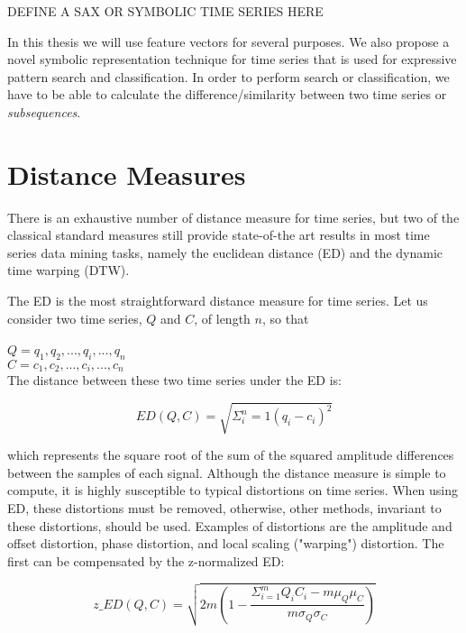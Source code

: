 DEFINE A SAX OR SYMBOLIC TIME SERIES HERE

\par

In this thesis we will use feature vectors for several purposes. We also propose a novel symbolic representation technique for time series that is used for expressive pattern search and classification. In order to perform search or classification, we have to be able to calculate the difference/similarity between two time series or \textit{subsequences}.

\section{Distance Measures}
\label{sec:distance}

There is an exhaustive number of distance measure for time series, but two of the classical standard measures still provide state-of-the art results in most time series data mining tasks, namely the euclidean distance (ED) and the dynamic time warping (DTW).
\par
The ED is the most straightforward distance measure for time series. Let us consider two time series, $Q$ and $C$, of length $n$, so that\\
\\
$Q = q_1, q_2, ..., q_i, ..., q_n$\\
$C = c_1, c_2, ..., c_i, ..., c_n$\\

The distance between these two time series under the ED is:

\begin{equation}
ED(Q,C) = \sqrt{\Sigma^n_i=1 (q_i - c_i)^2}
\end{equation}

which represents the square root of the sum of the squared amplitude differences between the samples of each signal. Although the distance measure is simple to compute, it is highly susceptible to typical distortions on time series. When using ED, these distortions must be removed, otherwise, other methods, invariant to these distortions, should be used. Examples of distortions are the amplitude and offset distortion, phase distortion, and local scaling ("warping") distortion. The first can be compensated by the z-normalized ED:

\begin{equation}
z\_ED(Q,C) = \sqrt{2m(1-\frac{\Sigma^m_{i=1}Q_iC_i - m\mu_Q\mu_C}{m\sigma_Q\sigma_C})}
\end{equation}

